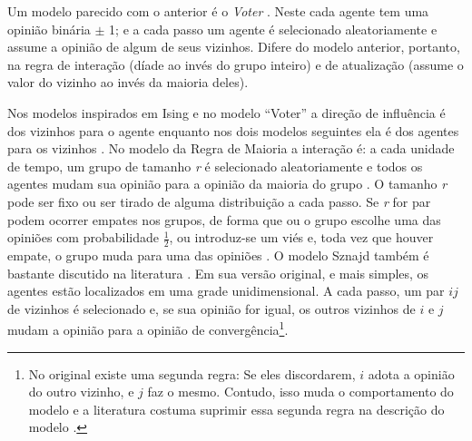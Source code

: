   Um modelo parecido com o anterior é o \textit{Voter} \cite{holley1975ergodic}. Neste
  cada agente tem uma opinião binária \(\pm\) 1; e a cada passo um agente é
  selecionado aleatoriamente e assume a opinião de algum de seus vizinhos.
  Difere do modelo anterior, portanto, na regra de interação (díade ao invés do
  grupo inteiro) e de atualização (assume o valor do vizinho ao invés da maioria
  deles).

  Nos modelos inspirados em Ising e no modelo ``Voter'' a direção de influência
  é dos vizinhos para o agente enquanto nos dois modelos seguintes ela é dos
  agentes para os vizinhos \cite{stauffer2003convince}. No modelo da Regra de
  Maioria a interação é: a cada unidade de tempo, um grupo de tamanho \textit{r}
  é selecionado aleatoriamente e todos os agentes mudam sua opinião para a
  opinião da maioria do grupo \cite{galam1990social,galam2012sociophysics}. O
  tamanho \textit{r} pode ser fixo ou ser tirado de alguma distribuição a cada
  passo. Se \textit{r} for par podem ocorrer empates nos grupos, de forma que ou
  o grupo escolhe uma das opiniões com probabilidade \(\frac{1}{2}\), ou
  introduz-se um viés e, toda vez que houver empate, o grupo muda para uma das
  opiniões \cite{galam2012sociophysics, galam1986majority}. O modelo Sznajd
  também é bastante discutido na literatura \cite{sznajd2000opinion,
    sirbu2017opinion,castellano2012social}. Em sua versão original, e mais
  simples, os agentes estão localizados em uma grade unidimensional. A cada
  passo, um par $ij$ de vizinhos é selecionado e, se sua opinião for igual, os
  outros vizinhos de \(i\) e \(j\) mudam a opinião para a opinião de
  convergência\footnote{No original existe uma segunda regra: Se eles
    discordarem, \(i\) adota a opinião do outro vizinho, e \(j\) faz o mesmo.
    Contudo, isso muda o comportamento do modelo e a literatura costuma suprimir
    essa segunda regra na descrição do modelo \cite{castellano2012social,
      stauffer2003convince}.}.

